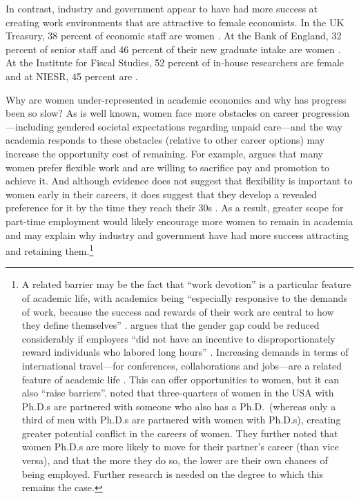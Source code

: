 \documentclass[a4paper, 1]{article}
\begin{document}
In contrast, industry and government appear to have had more success at creating work environments that are attractive to female economists. In the UK Treasury, 38 percent of economic staff are women \citep{CabinetOffice2020}. At the Bank of England, 32 percent of senior staff and 46 percent of their new graduate intake are women \citep{BoE2020}. At the Institute for Fiscal Studies, 52 percent of in-house researchers are female \citep{IFS2021} and at NIESR, 45 percent are \citep{NIESR2021a, NIESR2021b}.

Why are women under-represented in academic economics and why has progress been so slow? As is well known, women face more obstacles on career progression---including gendered societal expectations regarding unpaid care---and the way academia responds to these obstacles (relative to other career options) may increase the opportunity cost of remaining. For example, \citet{Goldin2014} argues that many women prefer flexible work and are willing to sacrifice pay and promotion to achieve it. And although evidence does not suggest that flexibility is important to women early in their careers, it does suggest that they develop a revealed preference for it by the time they reach their 30s \citep{Ferriman2009, Lubinski2006, Ceci2014}. As a result, greater scope for part-time employment would likely encourage more women to remain in academia and may explain why industry and government have had more success attracting and retaining them.\footnote{A related barrier may be the fact that ``work devotion'' is a particular feature of academic life, with academics being ``especially responsive to the demands of work, because the success and rewards of their work are central to how they define themselves'' \citep[p.~3]{Fox2021}. \citet{Goldin2014} argues that the gender gap could be reduced considerably if employers ``did not have an incentive to disproportionately reward individuals who labored long hours'' \citep[p.~1091]{Goldin2014}. Increasing demands in terms of international travel---for conferences, collaborations and jobs---are a related feature of academic life \citep{Canibano2016}. This can offer opportunities to women, but it can also ``raise barriers''. \citet{Ferber1979} noted that three-quarters of women in the USA with Ph.D.s are partnered with someone who also has a Ph.D.~(whereas only a third of men with Ph.D.s are partnered with women with Ph.D.s), creating greater potential conflict in the careers of women. They further noted that women Ph.D.s are more likely to move for their partner's career (than vice versa), and that the more they do so, the lower are their own chances of being employed. Further research is needed on the degree to which this remains the case.}
\end{document}

